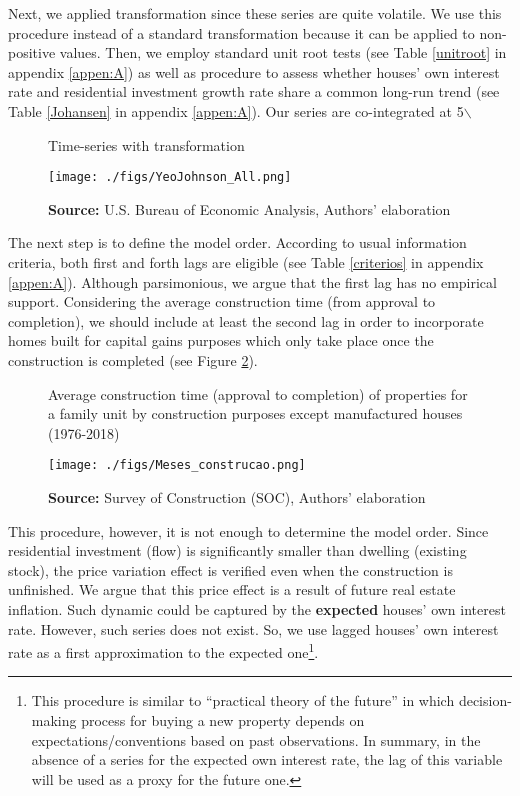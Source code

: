 \documentclass[11pt]{article}
\begin{document}
Next, we applied \textcite{yeo_new_2000} transformation since these series are quite volatile. We use this procedure instead of a standard \textcite{box_analysis_1964} transformation  because it can be applied to non-positive values. 
Then, we employ standard unit root tests (see Table \ref{unitroot} in appendix \ref{appen:A}) as well as \textcite{johansen_estimation_1991} procedure to assess whether houses' own interest rate and residential investment growth rate share a common long-run trend (see Table \ref{Johansen} in appendix \ref{appen:A}).
Our series are co-integrated at 5$\backslash$%

\begin{figure}[htb]
	\centering
	\caption{Time-series with \textcite{yeo_new_2000} transformation}
	\label{YeoJhonson}
	\texttt{[image: ./figs/YeoJohnson\_All.png]}
	\caption*{\textbf{Source:} U.S. Bureau of Economic Analysis, Authors' elaboration}
\end{figure}




The next step is to define the model order. According to usual information criteria, both first and forth lags are eligible (see Table \ref{criterios} in appendix \ref{appen:A}).
Although parsimonious, we argue that the first lag has no empirical support.
Considering the average construction time (from approval to completion), we should include at least the second lag in order to incorporate homes built for capital gains purposes which only take place once the construction is completed (see Figure \ref{meses}).

\begin{figure}[H]
	\centering
	\caption{Average construction time (approval to completion) of properties for a family unit by construction purposes except manufactured houses (1976-2018)}
    \label{meses}
	\texttt{[image: ./figs/Meses\_construcao.png]}
	\caption*{\textbf{Source:} Survey of Construction (SOC), Authors' elaboration}
\end{figure}

This procedure, however, it is not enough to determine the model order. 
Since residential investment (flow) is significantly smaller than dwelling (existing stock), the price variation effect  is verified even when the construction is unfinished. 
We argue that this price effect is a result of future real estate inflation.
Such dynamic could be captured by the \textbf{expected} houses' own interest rate.
However, such series does not exist. So, we use lagged houses' own interest rate as a first approximation to the expected one\footnote{This procedure is similar to \textcite{keynes_general_1937} ``practical theory of the future'' in which decision-making process for buying a new property depends on expectations/conventions based on past observations. 
In summary, in the absence of a series for the expected own interest rate, the lag of this variable will be used as a proxy for the future one.}.
\end{document}
